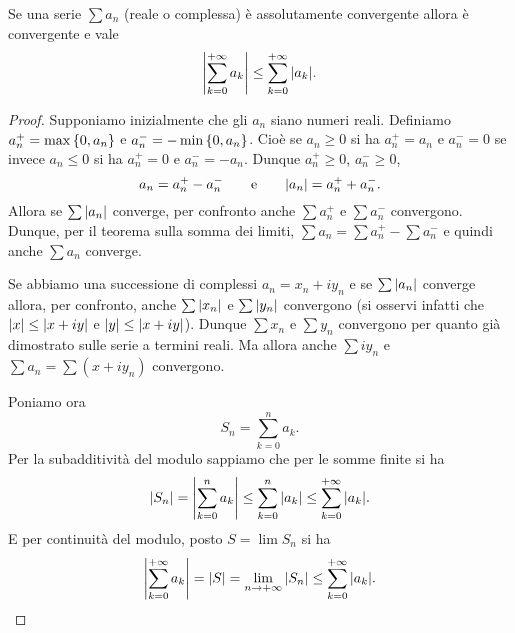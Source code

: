 \begin{theorem}\label{th:convergenza_assoluta}
\mymark{***}%
Se una serie $\sum a_n$ (reale o complessa)
è assolutamente convergente allora è convergente e vale
\[
  {\left|\sum_{k=0}^{+\infty} a_k\right|} \le \sum_{k=0}^{+\infty} {\left|a_k\right|}.
\]
\end{theorem}
%
\begin{proof}
\mymark{*}
Supponiamo inizialmente che gli $a_n$ siano numeri reali.
Definiamo $a_n^+ = \max{\left\{ 0, a_n \right\}}$ e $a_n^- = -\min {\left\{ 0, a_n \right\}}$.
Cioè se $a_n\ge 0$ si ha $a_n^+ = a_n$ e $a_n^-=0$ se invece $a_n\le 0$
si ha $a_n^+ =0$ e $a_n^- = -a_n$.
Dunque $a_n^+\ge 0$, $a_n^-\ge 0$,
\[
   a_n = a_n^+  - a_n^-
   \qquad\text{e}\qquad
   {\left|a_n\right|} = a_n^+ + a_n^-.
\]
Allora se $\sum {\left|a_n\right|}$ converge,
per confronto anche $\sum a_n^+$ e $\sum a_n^-$ convergono.
Dunque, per il teorema sulla somma dei limiti,
$\sum a_n = \sum a_n^+ - \sum a_n^-$
e quindi anche $\sum a_n$ converge.

Se abbiamo una successione di complessi $a_n = x_n + i y_n$
e se
$\sum {\left|a_n\right|}$ converge allora, per confronto,
anche $\sum {\left|x_n\right|}$ e $\sum{\left|y_n\right|}$ convergono
(si osservi infatti che ${\left|x\right|} \le {\left|x+iy\right|}$ e ${\left|y\right|}\le {\left|x+iy\right|}$).
Dunque $\sum x_n$ e $\sum y_n$ convergono per quanto
già dimostrato sulle serie a termini reali.
Ma allora anche $\sum i y_n$ e $\sum a_n = \sum (x + iy_n)$ convergono.

Poniamo ora
\[
  S_n  = \sum_{k=0}^n a_k.
\]
Per la subadditività
del modulo sappiamo che per le somme finite si ha
\[
 {\left|S_n\right|} ={\left|\sum_{k=0}^n a_k\right|}
 \le \sum_{k=0}^n {\left|a_k\right|} \le \sum_{k=0}^{+\infty} {\left|a_k\right|}.
\]
E per continuità del modulo, posto $S= \lim S_n$ si ha
\[
  {\left|\sum_{k=0}^{+\infty} a_k\right|}
  = {\left|S\right|}
  = \lim_{n\to +\infty} {\left|S_n\right|}
  \le \sum_{k=0}^{+\infty} {\left|a_k\right|}.
\]
\end{proof}

